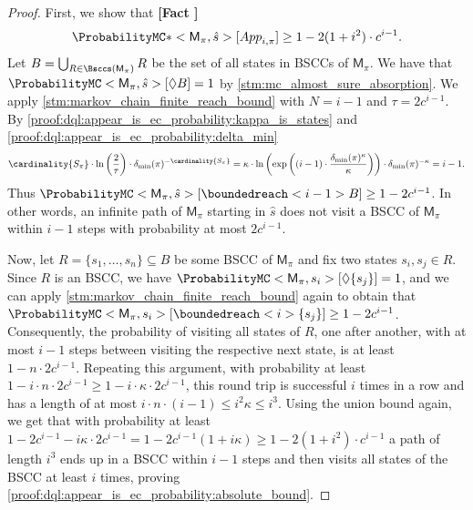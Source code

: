\documentclass{article}
\newcommand{\UnionSym}{\bigcup}
\newcommand{\Union}{\UnionSym}
\newcommand{\MC}{\mathsf{M}}
\newcommand{\States}{S}
\newcommand{\initialstate}{\hat{s}}
\newcommand{\strategy}{\pi}
\newcommand{\reach}{\Diamond}
\newcounter{proofref}
\newcommand{\plabel}[1]{\refstepcounter{proofref}\label{#1}\textbf{[Fact \Roman{proofref}]}}
\begin{document}
\begin{proof}
	First, we show that \plabel{proof:dql:appear_is_ec_probability:absolute_bound}
	\begin{equation*}
		\ProbabilityMC*<\MC_\strategy, \initialstate>[{App}_{i, \strategy}] \geq 1 - 2 (1 + i^2) \cdot c^{i - 1}.
	\end{equation*}
	Let $B = \Union_{R \in \Bsccs(\MC_\strategy)} R$ be the set of all states in BSCCs of $\MC_\strategy$.
	We have that $\ProbabilityMC<\MC_\strategy, \initialstate>[\reach B] = 1$ by \cref{stm:mc_almost_sure_absorption}.
	We apply \cref{stm:markov_chain_finite_reach_bound} with $N = i - 1$ and $\tau = 2 c^{i - 1}$.
	By \ref{proof:dql:appear_is_ec_probability:kappa_is_states} and \ref{proof:dql:appear_is_ec_probability:delta_min}
	\begin{equation*}
		\cardinality{\States_\strategy} \cdot \ln\left(\frac{2}{\tau} \right) \cdot \delta_{\min}(\strategy)^{-\cardinality{\States_\strategy}} = \kappa \cdot \ln\left(\exp\left( (i-1) \cdot \frac{\delta_{\min}(\strategy)^\kappa}{\kappa}\right)\right) \cdot \delta_{\min}(\strategy)^{-\kappa} = i - 1.
	\end{equation*}
	Thus $\ProbabilityMC<\MC_\strategy, \initialstate>[\boundedreach<i - 1> B] \geq 1 - 2 c^{i - 1}$.
	In other words, an infinite path of $\MC_\strategy$ starting in $\initialstate$ does not visit a BSCC of $\MC_\strategy$ within $i - 1$ steps with probability at most $2 c^{i - 1}$.

	Now, let $R = \{s_1, \dots, s_n\} \subseteq B$ be some BSCC of $\MC_\strategy$ and fix two states $s_i, s_j \in R$.
	Since $R$ is an BSCC, we have $\ProbabilityMC<\MC_\strategy, s_i>[\reach \{s_j\}] = 1$, and we can apply \cref{stm:markov_chain_finite_reach_bound} again to obtain that $\ProbabilityMC<\MC_\strategy, s_i>[\boundedreach<i> \{s_j\}] \geq 1 - 2 c^{i - 1}$.
	Consequently, the probability of visiting all states of $R$, one after another, with at most $i - 1$ steps between visiting the respective next state, is at least $1 - n \cdot 2 c^{i - 1}$.
	Repeating this argument, with probability at least $1 - i \cdot n \cdot 2 c^{i - 1} \geq 1 - i \cdot \kappa \cdot 2 c^{i - 1}$, this round trip is successful $i$ times in a row and has a length of at most $i \cdot n \cdot (i - 1) \leq i^2 \kappa \leq i^3$.
	Using the union bound again, we get that with probability at least $1 - 2 c^{i - 1} - i \kappa \cdot 2 c^{i - 1} = 1 - 2 c^{i - 1} (1 + i \kappa) \geq 1 - 2 (1 + i^2) \cdot c^{i - 1}$ a path of length $i^3$ ends up in a BSCC within $i - 1$ steps and then visits all states of the BSCC at least $i$ times, proving \ref{proof:dql:appear_is_ec_probability:absolute_bound}.


\end{proof}
\end{document}
